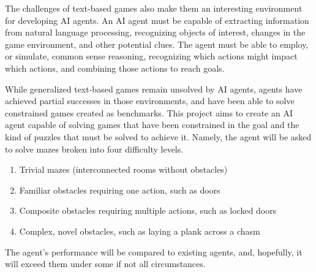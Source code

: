The challenges of text-based games also make them an interesting
environment for developing AI agents. An AI agent must be capable of
extracting information from natural language processing, recognizing
objects of interest, changes in the game environment, and other
potential clues. The agent must be able to employ, or simulate, common
sense reasoning, recognizing which actions might impact which actions,
and combining those actions to reach goals.

While generalized text-based games remain unsolved by AI agents, agents
have achieved partial successes in those environments, and have been
able to solve constrained games created as benchmarks. This project aims
to create an AI agent capable of solving games that have been
constrained in the goal and the kind of puzzles that must be solved to
achieve it. Namely, the agent will be asked to solve mazes broken into
four difficulty levels.

\begin{enumerate}
    \item Trivial mazes (interconnected rooms without obstacles)
    \item Familiar obstacles requiring one action, such as doors
    \item Composite obstacles requiring multiple actions, such as locked
        doors
    \item Complex, novel obstacles, such as laying a plank across a
        chasm
\end{enumerate}

The agent's performance will be compared to existing agents, and,
hopefully, it will exceed them under some if not all circumstances.
